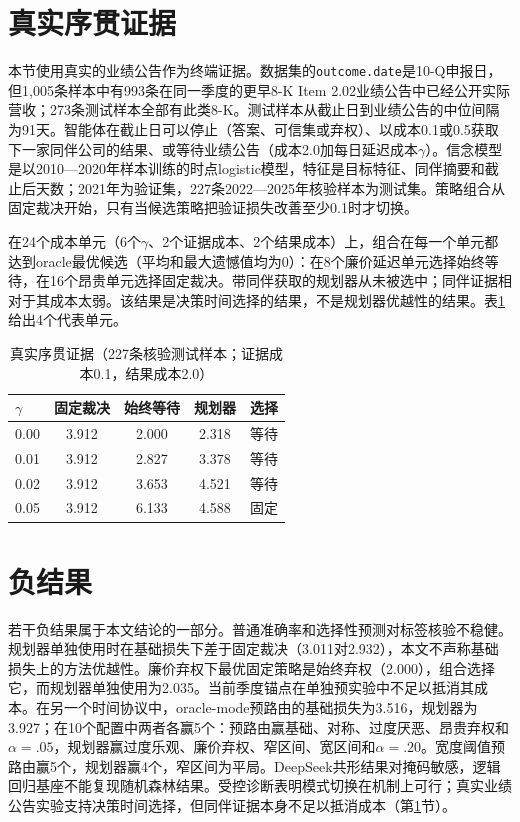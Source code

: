 \documentclass[12pt,openany]{ctexbook}
\begin{document}
\section{真实序贯证据}
\label{sec:sequential-zh}
本节使用真实的业绩公告作为终端证据。数据集的\texttt{outcome.date}是10-Q申报日，但1,005条样本中有993条在同一季度的更早8-K Item 2.02业绩公告中已经公开实际营收；273条测试样本全部有此类8-K。测试样本从截止日到业绩公告的中位间隔为91天。智能体在截止日可以停止（答案、可信集或弃权）、以成本0.1或0.5获取下一家同伴公司的结果、或等待业绩公告（成本2.0加每日延迟成本$\gamma$）。信念模型是以2010—2020年样本训练的时点logistic模型，特征是目标特征、同伴摘要和截止后天数；2021年为验证集，227条2022—2025年核验样本为测试集。策略组合从固定裁决开始，只有当候选策略把验证损失改善至少0.1时才切换。\par
在24个成本单元（6个$\gamma$、2个证据成本、2个结果成本）上，组合在每一个单元都达到oracle最优候选（平均和最大遗憾值均为0）：在8个廉价延迟单元选择始终等待，在16个昂贵单元选择固定裁决。带同伴获取的规划器从未被选中；同伴证据相对于其成本太弱。该结果是决策时间选择的结果，不是规划器优越性的结果。表\ref{tab:sequential-zh}给出4个代表单元。\par
\begin{table}[htbp]
\centering
\caption{真实序贯证据（227条核验测试样本；证据成本0.1，结果成本2.0）}
\label{tab:sequential-zh}
\setlength{\tabcolsep}{3pt}
\begin{tabular}{lcccc}
\toprule
$\gamma$ & 固定裁决 & 始终等待 & 规划器 & 选择 \\
\midrule
0.00 & 3.912 & 2.000 & 2.318 & 等待 \\
0.01 & 3.912 & 2.827 & 3.378 & 等待 \\
0.02 & 3.912 & 3.653 & 4.521 & 等待 \\
0.05 & 3.912 & 6.133 & 4.588 & 固定 \\
\bottomrule
\end{tabular}
\end{table}

\section{负结果}
若干负结果属于本文结论的一部分。普通准确率和选择性预测对标签核验不稳健。规划器单独使用时在基础损失下差于固定裁决（3.011对2.932），本文不声称基础损失上的方法优越性。廉价弃权下最优固定策略是始终弃权（2.000），组合选择它，而规划器单独使用为2.035。当前季度锚点在单独预实验中不足以抵消其成本。在另一个时间协议中，oracle-mode预路由的基础损失为3.516，规划器为3.927；在10个配置中两者各赢5个：预路由赢基础、对称、过度厌恶、昂贵弃权和$\alpha=.05$，规划器赢过度乐观、廉价弃权、窄区间、宽区间和$\alpha=.20$。宽度阈值预路由赢5个，规划器赢4个，窄区间为平局。DeepSeek共形结果对掩码敏感，逻辑回归基座不能复现随机森林结果。受控诊断表明模式切换在机制上可行；真实业绩公告实验支持决策时间选择，但同伴证据本身不足以抵消成本（第\ref{sec:sequential-zh}节）。\par
\end{document}
